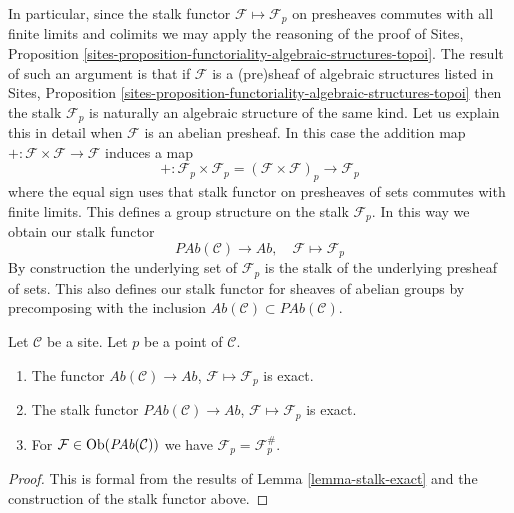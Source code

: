 \noindent
In particular, since the stalk functor $\mathcal{F} \mapsto \mathcal{F}_p$
on presheaves commutes with all finite limits and colimits we may apply the
reasoning of the proof of
Sites,
Proposition \ref{sites-proposition-functoriality-algebraic-structures-topoi}.
The result of such an argument is that if $\mathcal{F}$ is a
(pre)sheaf of algebraic structures listed in
Sites,
Proposition \ref{sites-proposition-functoriality-algebraic-structures-topoi}
then the stalk $\mathcal{F}_p$ is naturally an algebraic structure
of the same kind. Let us explain this in detail when $\mathcal{F}$
is an abelian presheaf. In this case the addition map
$+ : \mathcal{F} \times \mathcal{F} \to \mathcal{F}$ induces
a map
$$
+ :
\mathcal{F}_p \times \mathcal{F}_p
=
(\mathcal{F} \times \mathcal{F})_p
\longrightarrow
\mathcal{F}_p
$$
where the equal sign uses that stalk functor on presheaves of sets
commutes with finite limits. This defines a group structure on
the stalk $\mathcal{F}_p$. In this way we obtain
our stalk functor
$$
\textit{PAb}(\mathcal{C}) \longrightarrow \textit{Ab}, \quad
\mathcal{F} \longmapsto \mathcal{F}_p
$$
By construction the underlying set of $\mathcal{F}_p$ is the stalk of the
underlying presheaf of sets. This also defines our stalk functor for
sheaves of abelian groups by precomposing with the inclusion
$\textit{Ab}(\mathcal{C}) \subset \textit{PAb}(\mathcal{C})$.

\begin{lemma}
\label{lemma-stalk-exact-abelian}
Let $\mathcal{C}$ be a site.
Let $p$ be a point of $\mathcal{C}$.
\begin{enumerate}
\item The functor
$\textit{Ab}(\mathcal{C}) \to \textit{Ab}$,
$\mathcal{F} \mapsto \mathcal{F}_p$ is exact.
\item The stalk functor
$\textit{PAb}(\mathcal{C}) \to \textit{Ab}$,
$\mathcal{F}  \mapsto  \mathcal{F}_p$
is exact.
\item For $\mathcal{F} \in \mathop{\rm Ob}\nolimits(\textit{PAb}(\mathcal{C}))$
we have $\mathcal{F}_p = \mathcal{F}^\#_p$.
\end{enumerate}
\end{lemma}

\begin{proof}
This is formal from the results of
Lemma \ref{lemma-stalk-exact}
and the construction of the stalk functor above.
\end{proof}

